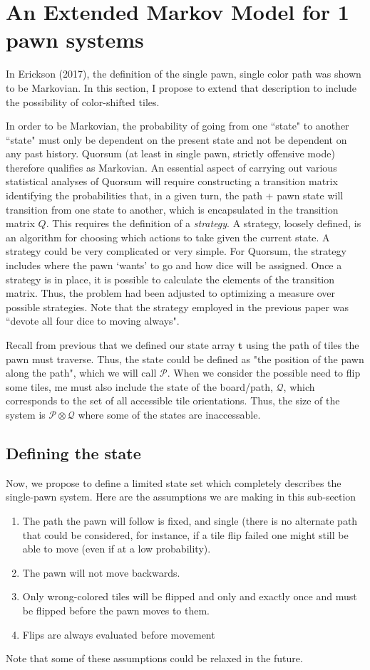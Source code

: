 \documentclass[letterpaper,11pt]{article}
\begin{document}
\section{An Extended Markov Model for 1 pawn systems}
In Erickson (2017), the definition of the single pawn, single color path was
shown to be Markovian.  In this section, I propose to extend that description
to include the possibility of color-shifted tiles.

In order to be Markovian, the probability of going from one ``state" to another
``state" must only be dependent on the present state and not be dependent on
any past history.  Quorsum (at least in single pawn, strictly offensive mode)
therefore qualifies as Markovian.  An essential aspect of carrying out various
statistical analyses of Quorsum will require constructing a transition matrix
identifying the probabilities that, in a given turn, the path + pawn state will
transition from one state to another, which is encapsulated in the transition
matrix $Q$.  This requires the definition of a \textit{strategy}.  A strategy,
loosely defined, is an algorithm for choosing which actions to take given the 
current state.  A strategy could be very complicated or very simple.  For
Quorsum, the strategy includes where the pawn `wants' to go and how dice will
be assigned.  Once a strategy is in place, it is possible to calculate the
elements of the transition matrix.  Thus, the problem had been adjusted to
optimizing a measure over possible strategies.  Note that the strategy
employed in the previous paper was ``devote all four dice to moving always".

Recall from previous that we defined our state array $\mathbf{t}$ using the path
of tiles the pawn must traverse.  Thus, the state could be defined as "the
position of the pawn along the path", which we will call $\mathcal{P}$.  When
we consider the possible need to flip some tiles, me must also include the 
state of the board/path, $\mathcal{Q}$, which corresponds to the set of all 
accessible tile orientations.  Thus, the size of the system is $\mathcal{P}
\otimes \mathcal{Q}$ where some of the states are inaccessable.

\subsection{Defining the state}
Now, we propose to define a limited state set which completely describes the
single-pawn system.  Here are the assumptions we are making in this sub-section
\begin{enumerate}
	\item The path the pawn will follow is fixed, and single (there is no
		alternate path that could be considered, for instance, if a
		tile flip failed one might still be able to move (even if at
		a low probability).
	\item The pawn will not move backwards.
	\item Only wrong-colored tiles will be flipped and only and exactly
		once and must be flipped before the pawn moves to them.
	\item Flips are always evaluated before movement
\end{enumerate}
Note that some of these assumptions could be relaxed in
the future.  
\end{document}
